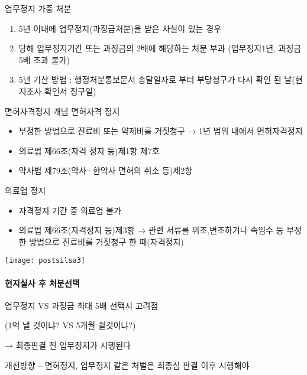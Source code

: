 업무정지 가중 처분
\begin{enumerate}[1)]\tightlist
\item 5년 이내에 업무정지(과징금처분)을 받은 사실이 있는 경우
\item 당해 업무정지기간 또는 과징금의 2배에 해당하는 처분 부과 (업무정지1년, 과징금 5배 초과 불가)
\item 5년 기산 방법 : 행정처분통보문서 송달일자로 부터 부당청구가 다시 확인 된 날(현지조사 확인서 징구일)
\end{enumerate}

\begin{commentbox}{면허자격정지 개념}
면허자격 정지
\begin{itemize}\tightlist
\item 부정한 방법으로 진료비 또는 약제비를 거짓청구 → 1년 범위 내에서 면허자격정지
\item 의료법 제66조(자격 정지 등)제1항 제7호
\item  약사법 제79조(약사·한약사 면허의 취소 등)제2항
\end{itemize}
의료업 정지
\begin{itemize}\tightlist
\item 자격정지 기간 중 의료업 불가
\item 의료법 제66조(자격정지 등)제3항 → 관련 서류를 위조,변조하거나 속임수 등 부정한 방법으로 진료비를 거짓청구 한 때(자격정지)
\end{itemize}
\end{commentbox}
\texttt{[image: postsilsa3]}\par

\paragraph{현지실사 후 처분선택 }\par
업무정지  VS  과징금 최대 5배 선택시 고려점\par
(1억 낼 것이냐?  VS  5개월 쉴것이냐?)\par
→  최종판결 전 업무정지가 시행된다\par
개선방향 – 면허정지, 업무정지 같은 처벌은 최종심 판결 이후 시행해야

